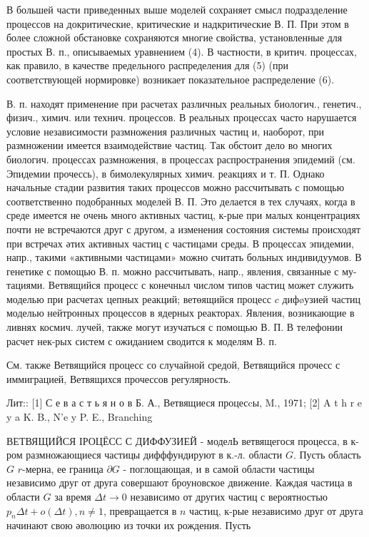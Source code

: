 \documentclass[10pt]{article}
\begin{document}
В большей части приведенных выше моделей сохраняет смысл подразделение процессов на докритические, критические и надкритические В. П. При этом в более сложной обстановке сохраняются многие свойства, установленные для простых В. п., описываемых уравнением (4). В частности, в критич. процессах, как правило, в качестве предельного распределения для (5) (при соответствующей нормировке) возникает показательное распределение (6).



В. п. находят применение при расчетах различных реальных биологич., генетич., физич., химич. или технич. процессов. В реальных процессах часто нарушается условие независимости размножения различных частиц и, наоборот, при размножении имеется взаимодействие частиц. Так обстоит дело во многих биологич. процессах размножения, в процессах распространения эпидемий (см. Эпидемии прочессь), в бимолекулярных химич. реакциях и т. П. Однако начальные стадии развития таких процессов можно рассчитывать с помощью соответственно подобранных моделей В. П. Это делается в тех случаях, когда в среде имеется не очень много активных частиц, к-рые при малых концентрациях почти не встречаются друг с другом, а изменения состояния системы происходят при встречах әтих активных частиц с частицами среды. В процессах эпидемии, напр., такими «активными частицами» можно считать больных индивидуумов. В генетике с помощью В. п. можно рассчитывать, напр., явления, связанные с му- тациями. Ветвящийся процесс с конечныл числом типов частиц может служить моделью при расчетах цепных реакций; ветөящийся процесс $c$ дифøузией частиц моделью нейтронных процессов в ядерных реакторах. Явления, возникающие в ливнях космич. лучей, также могут изучаться с помощью В. П. В телефонии расчет нек-рых систем с ожиданием сводится к моделям В. п.



См. также Ветвящийся процесс со случайной средой, Ветвящийся прочесс с иммиграцией, Ветвящихся прочессов регулярность.



Лит:: [1] С е в а с т ь я н о в Б. А., Ветвящиеся процесcы, M., 1971; [2] A t h r e y a K. B., N'e y P. E., Branching



ВЕТВЯЩИЙСЯ ІРОЦЁСС С ДИФФУЗИЕЙ - моделЬ ветвящегося процесса, в к-ром размножающиеся частицы дифффундируют в к.-л. области $G$. Пусть область $G$ $r$-мерна, ее граница $\partial G$ - поглощающая, и в самой области частицы независимо друг от друга совершают броуновское движение. Каждая частица в области $G$ за время $\Delta t \rightarrow 0$ независимо от других частиц с вероятностью $p_{n} \Delta t+o(\Delta t), n \neq 1$, превращается в $n$ частиц, к-рые независимо друг от друга начинают свою әволюцию из точки их рождения. Пусть
\end{document}
